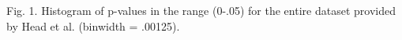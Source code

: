 Fig. 1. Histogram of p-values in the range (0-.05) for the entire dataset provided by Head et al. (binwidth = .00125).
